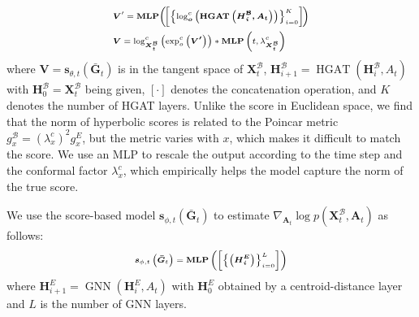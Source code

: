 \documentclass[letterpaper]{article} %
\begin{document}
\begin{equation}
\begin{scriptsize}{
\begin{aligned}
&\boldsymbol{V}^\prime=\operatorname{\textbf{MLP}}\!\left(\!\left[\left\{\log _{\boldsymbol{o}}^{c}\left(\boldsymbol{\operatorname{HGAT}\left(\boldsymbol{H}^\mathcal{B}_{i}, \boldsymbol{A}_{t}\right)}\right)\right\}_{i=0}^{K}\right]\!\right) \\
&\boldsymbol{V} = \log^c_{\boldsymbol{X}^\mathcal{B}_{t}} \left(\exp^c_o 
\left( \boldsymbol{V^\prime}\right) \right) * \operatorname{\textbf{MLP}}\left(t,\lambda^c_{\boldsymbol{X}^\mathcal{B}_t}\right)
\end{aligned}
}\end{scriptsize}
\end{equation}
%
where $\boldsymbol{V}=\boldsymbol{s}_{\theta, t}(\boldsymbol{\bar{G}}_{t}) $ is in the tangent space of $\boldsymbol{X}^\mathcal{B}_{t}$, $\boldsymbol{H}^\mathcal{B}_{i+1} = \operatorname{HGAT}(\boldsymbol{H}^\mathcal{B}_i, A_t)$ with $\boldsymbol{H}^\mathcal{B}_0 = \boldsymbol{X}^\mathcal{B}_t$ being given, $[\cdot]$ denotes the concatenation operation, and $K$ denotes the number of HGAT layers.
Unlike the score in Euclidean space, we find that the norm of hyperbolic scores is related to the Poincar metric $g^\mathcal{B}_x=(\lambda^c_x)^2g^E_x$, 
but the metric varies with $x$, which makes it difficult to match the score. We use an MLP to rescale the output according to the time step and the conformal factor $\lambda^c_x$, which empirically helps the model capture the norm of the true score.

We use the score-based model $\boldsymbol{s}_{\phi, t}(\boldsymbol{\bar{G}}_{t}) $ to estimate $\nabla_{\boldsymbol{A}_{t}} \log p\left(\boldsymbol{X}^\mathcal{B}_{t},\boldsymbol{A}_{t} \right)$ as follows:
\begin{equation}
\begin{scriptsize}
\boldsymbol{s}_{\phi, t}\left(\boldsymbol{\bar{G}}_{t}\right)=\operatorname{\textbf{MLP}}
\left(\left[\left\{\left(\boldsymbol{\boldsymbol{H}^E_{i}}\right)\right\}_{i=0}^{L}\right]\right)
\end{scriptsize}
\end{equation}
where $\boldsymbol{H}^E_{i+1} = \operatorname{\mathrm{GNN}}(\boldsymbol{H}^E_i,A_t)$ with $\boldsymbol{H}^E_0$ obtained by a centroid-distance layer and $L$ is the number of GNN layers. 
\end{document}
